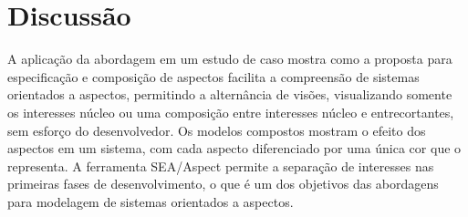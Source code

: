 \section{Discussão}

A aplicação da abordagem em um estudo de caso mostra como a proposta para especificação e composição de aspectos facilita a compreensão de
sistemas orientados a aspectos, permitindo a alternância de visões, visualizando somente os interesses núcleo ou uma composição entre interesses núcleo e entrecortantes, 
sem esforço do desenvolvedor. Os modelos compostos mostram o efeito dos aspectos em um sistema, com cada aspecto diferenciado por uma única cor que o
representa. A ferramenta SEA/Aspect permite a separação de interesses nas primeiras fases de desenvolvimento, o que é um dos objetivos das abordagens para modelagem
de sistemas orientados a aspectos.
